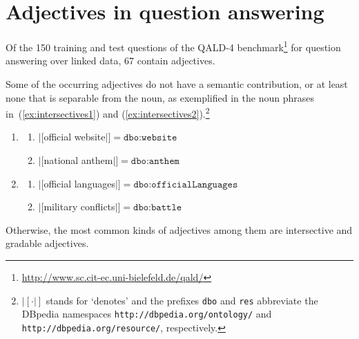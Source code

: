 \documentclass[11pt]{article}
\begin{document}
\section{Adjectives in question answering}

Of the 150 training and test questions of the QALD-4 benchmark\footnote{\url{http://www.sc.cit-ec.uni-bielefeld.de/qald/}} 
for question answering over linked data, 67 contain adjectives. 

Some of the occurring adjectives do not have a semantic contribution, or at least none that is separable from the noun, 
as exemplified in the noun phrases in~(\ref{ex:intersectives1}) and (\ref{ex:intersectives2}).\footnote{$|[\cdot|]$ stands for 
`denotes' and the prefixes \texttt{dbo} and \texttt{res} abbreviate the DBpedia namespaces \texttt{http://dbpedia.org/ontology/}
and \texttt{http://dbpedia.org/resource/}, respectively.}
\begin{enumerate}
\item \begin{enumerate}
 \item $|[$official website$|]=\texttt{dbo:website}$
 \item $|[$national anthem$|]=\texttt{dbo:anthem}$
 \end{enumerate}
 \label{ex:intersectives1}
\item \begin{enumerate}
 \item $|[$official languages$|]=\texttt{dbo:officialLanguages}$
 \item $|[$military conflicts$|]=\texttt{dbo:battle}$ 
 \end{enumerate}
 \label{ex:intersectives2}
\end{enumerate}

Otherwise, the most common kinds of adjectives among them are intersective and gradable adjectives.
\end{document}
